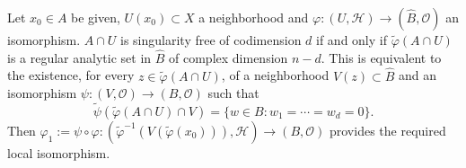 Let $x_0 \in A$ be given, $U(x_0) \subset X$ a neighborhood and $\varphi: (U, \mathcal{H}) \to (\hat{B}, \mathcal{O})$ an isomorphism. $A \cap U$ is singularity free of codimension $d$ if and only if $\tilde{\varphi}(A \cap U)$ is a regular analytic set in $\hat{B}$ of complex dimension $n - d$. This is equivalent to the existence, for every $z \in \tilde{\varphi}(A \cap U)$, of a neighborhood $V(z) \subset \hat{B}$ and an isomorphism $\psi: (V, \mathcal{O}) \to (B, \mathcal{O})$ such that
$$\tilde{\psi}(\tilde{\varphi}(A \cap U) \cap V) = \{w \in B: w_1 = \cdots = w_d = 0\}.$$
Then $\varphi_1 := \psi \circ \varphi: (\tilde{\varphi}^{-1}(V(\tilde{\varphi}(x_0))), \mathcal{H}) \to (B, \mathcal{O})$ provides the required local isomorphism.
